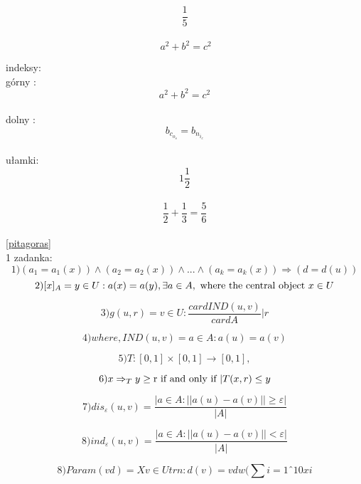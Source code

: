\documentclass[a4paper,12pt]{article}
\title{}
\author{Marek Pączkowski}
\date{2017.10.29}
\begin{document}
\maketitle
\begin{equation}
\frac{1}{5}
\label{eq:rownanie1}
\end{equation}\\

\begin{equation}
\ a^2+b^2=c^2
\label{pitagoras}
\end{equation}


indeksy:\\
górny : $$a^2+b^2=c^2$$\\
dolny : $$b_c_o_s=b_n_i_c$$\\

ułamki:\\
$$1\frac{1}{2}$$\\
$$\frac{1}{2}+\frac{1}{3}=\frac{5}{6}$$\\


\eqref{pitagoras}\\
1
zadanka:\\

 $$1) (a_1 = a_1(x))  \wedge (a_2 = a_2(x))  \wedge . . .  \wedge (a_k = a_k(x)) \Longrightarrow(d = d(u))$$
$$2) [x]_A = {y \in U : a(x) = a(y), \exists a \in A},\textnormal{ where the central object }x \in U $$

$$3) g(u, r) = {v \in U :
\frac {card{IND(u, v)}}
{card{A}}| ­ r} $$

$$4)where, IND(u, v) = {a \in A : a(u) = a(v)}$$

$$5) T : [0, 1] \times [0, 1] \rightarrow [0, 1],$$

$$6) x \Rightarrow _T y \geq \textnormal{r if and only if }| T(x, r)  \leq y $$

$$7)dis_\varepsilon (u, v) = \frac{ |{a \in A : ||a(u) - a(v)|| \geq  \varepsilon}| 
}{|A|} $$

$$ 8)ind_\varepsilon (u, v) =\frac{ |{a \in A : ||a(u) - a(v)||} < \varepsilon|}
{|A|}$$

$$8) Param(vd) = X
{v∈Utrn:d(v)=vd}
w(

\sum{i=1}ˆ{10}x{i}$$
\section{}
\end{document}
